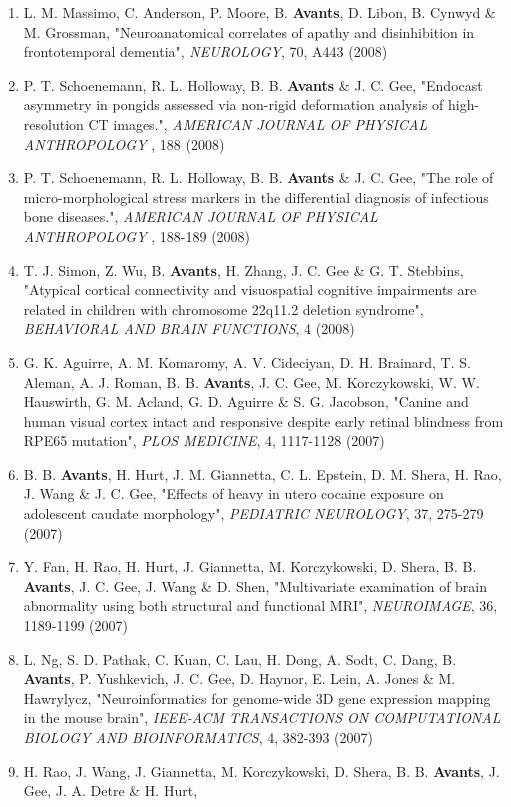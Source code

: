 \documentclass[11pt]{moderncv} %
\begin{document}
\begin{enumerate}
{\em NEUROIMAGE}, 39, 1014-1026 (2008)
\item L. M. Massimo, C. Anderson, P. Moore, B. \textbf{Avants}, D. Libon, B. Cynwyd \&  M. Grossman, 
"Neuroanatomical correlates of apathy and disinhibition in frontotemporal dementia", 
{\em NEUROLOGY}, 70, A443 (2008)
\item P. T. Schoenemann, R. L. Holloway, B. B. \textbf{Avants} \&  J. C. Gee, 
"Endocast asymmetry in pongids assessed via non-rigid deformation analysis of high-resolution CT images.", 
{\em AMERICAN JOURNAL OF PHYSICAL ANTHROPOLOGY}
, 188 (2008)
\item P. T. Schoenemann, R. L. Holloway, B. B. \textbf{Avants} \&  J. C. Gee, 
"The role of micro-morphological stress markers in the differential diagnosis of infectious bone diseases.", 
{\em AMERICAN JOURNAL OF PHYSICAL ANTHROPOLOGY}
, 188-189 (2008)
\item T. J. Simon, Z. Wu, B. \textbf{Avants}, H. Zhang, J. C. Gee \&  G. T. Stebbins, 
"Atypical cortical connectivity and visuospatial cognitive impairments are related in children with chromosome 22q11.2 deletion syndrome", 
{\em BEHAVIORAL AND BRAIN FUNCTIONS}, 4 (2008)
\item G. K. Aguirre, A. M. Komaromy, A. V. Cideciyan, D. H. Brainard, T. S. Aleman, A. J. Roman, B. B. \textbf{Avants}, J. C. Gee, M. Korczykowski, W. W. Hauswirth, G. M. Acland, G. D. Aguirre \&  S. G. Jacobson, 
"Canine and human visual cortex intact and responsive despite early retinal blindness from RPE65 mutation", 
{\em PLOS MEDICINE}, 4, 1117-1128 (2007)
\item B. B. \textbf{Avants}, H. Hurt, J. M. Giannetta, C. L. Epstein, D. M. Shera, H. Rao, J. Wang \&  J. C. Gee, 
"Effects of heavy in utero cocaine exposure on adolescent caudate morphology", 
{\em PEDIATRIC NEUROLOGY}, 37, 275-279 (2007)
\item Y. Fan, H. Rao, H. Hurt, J. Giannetta, M. Korczykowski, D. Shera, B. B. \textbf{Avants}, J. C. Gee, J. Wang \&  D. Shen, 
"Multivariate examination of brain abnormality using both structural and functional MRI", 
{\em NEUROIMAGE}, 36, 1189-1199 (2007)
\item L. Ng, S. D. Pathak, C. Kuan, C. Lau, H. Dong, A. Sodt, C. Dang, B. \textbf{Avants}, P. Yushkevich, J. C. Gee, D. Haynor, E. Lein, A. Jones \&  M. Hawrylycz, 
"Neuroinformatics for genome-wide 3D gene expression mapping in the mouse brain", 
{\em IEEE-ACM TRANSACTIONS ON COMPUTATIONAL BIOLOGY AND BIOINFORMATICS}, 4, 382-393 (2007)
\item H. Rao, J. Wang, J. Giannetta, M. Korczykowski, D. Shera, B. B. \textbf{Avants}, J. Gee, J. A. Detre \&  H. Hurt, 

\end{enumerate}
\end{document}
